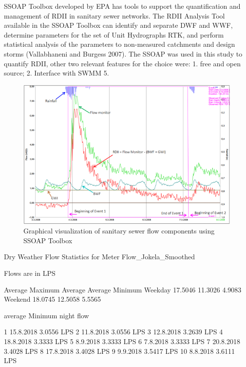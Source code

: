 SSOAP Toolbox developed by \ac{EPA} has tools to support the quantification and management of RDII in sanitary sewer networks. The RDII Analysis Tool available in the SSOAP Toolbox can identify and separate DWF and WWF, determine parameters for the set of Unit Hydrographs RTK, and perform statistical analysis of the parameters to non-measured catchments and design storms (Vallabhaneni and Burgess 2007). The SSOAP was used in this study to quantify RDII, other two relevant features for the choice were: 1. free and open source; 2. Interface with SWMM 5.


\begin{figure}[ht]
    \centering
	\includegraphics[scale=1.2]{figures/SSOAP_example.png}
	\caption{Graphical visualization of sanitary sewer flow components using SSOAP Toolbox}
	\label{fig:SSOAPexample}
\end{figure}

Dry Weather Flow Statistics for Meter Flow_Jokela_Smoothed

Flows are in LPS

           Average Maximum   Average   Average Minimum
Weekday       17.5046       11.3026        4.9083
Weekend       18.0745       12.5058        5.5565



average Minimum night flow

1   15.8.2018   3.0556 LPS
2   11.8.2018   3.0556 LPS
3   12.8.2018   3.2639 LPS
4   18.8.2018   3.3333 LPS
5   8.9.2018   3.3333 LPS
6   7.8.2018   3.3333 LPS
7   20.8.2018   3.4028 LPS
8   17.8.2018   3.4028 LPS
9   9.9.2018   3.5417 LPS
10   8.8.2018   3.6111 LPS



